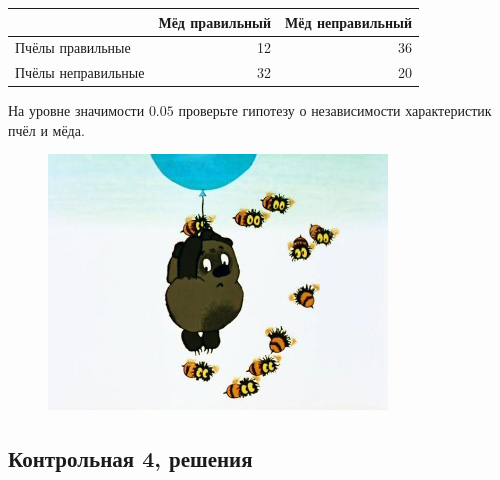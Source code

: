 \documentclass[12pt, a4paper]{article}\usepackage[]{graphicx}\usepackage[]{color}
\begin{document}
\begin{enumerate}
\begin{tabular}{lrr}
\toprule
 & Мёд правильный & Мёд неправильный \\
\midrule
Пчёлы правильные & 12	& 36 \\
Пчёлы неправильные & 32	& 20 \\
\bottomrule
\end{tabular}


На уровне значимости $0.05$ проверьте гипотезу о независимости характеристик пчёл и мёда.


\begin{figure}[b]
\centering
\includegraphics[width=9cm]{images/winnie_kr_4}
\end{figure}



\end{enumerate}


\subsection{Контрольная 4, решения}
\end{document}
